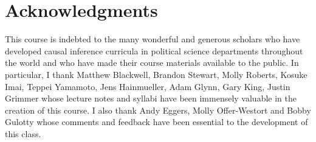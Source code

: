 \documentclass[11pt, article, oneside]{memoir}
\theoremstyle{Assumption}
\begin{document}
\section*{Acknowledgments}

This course is indebted to the many wonderful and generous scholars who have developed causal inference curricula in political science departments throughout the world and who have made their course materials available to the public. In particular, I thank Matthew Blackwell, Brandon Stewart, Molly Roberts, Kosuke Imai, Teppei Yamamoto, Jens Hainmueller, Adam Glynn, Gary King, Justin Grimmer whose lecture notes and syllabi have been immensely valuable in the creation of this course. I also thank Andy Eggers, Molly Offer-Westort and Bobby Gulotty whose comments and feedback have been essential to the development of this class.
\end{document}
